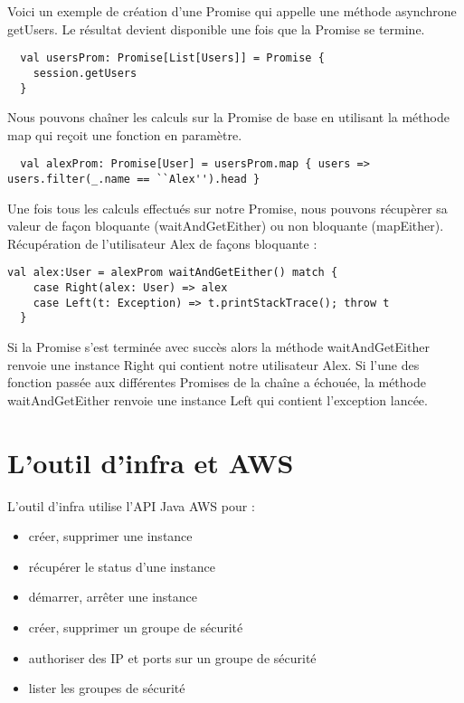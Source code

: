 Voici un exemple de création d'une Promise qui appelle une méthode asynchrone
getUsers. Le résultat devient disponible une fois que la Promise se termine.
\lstset{language=scala,
  frame=single                   %
}
\begin{lstlisting}
  val usersProm: Promise[List[Users]] = Promise {
    session.getUsers
  }
\end{lstlisting}

Nous pouvons chaîner les calculs sur la Promise de base en utilisant la méthode
map qui reçoit une fonction en paramètre. 
\begin{lstlisting}
  val alexProm: Promise[User] = usersProm.map { users => users.filter(_.name == ``Alex'').head }
\end{lstlisting}

Une fois tous les calculs effectués sur notre Promise, nous pouvons récupèrer sa
valeur de façon bloquante (waitAndGetEither) ou non bloquante (mapEither).
Récupération de l'utilisateur Alex de façons bloquante :
\begin{lstlisting}
val alex:User = alexProm waitAndGetEither() match {
    case Right(alex: User) => alex
    case Left(t: Exception) => t.printStackTrace(); throw t
  }
\end{lstlisting}
Si la Promise s'est terminée avec succès alors la méthode waitAndGetEither
renvoie une instance Right qui contient notre utilisateur Alex.
Si l'une des fonction passée aux différentes Promises de la chaîne a échouée, la
méthode waitAndGetEither renvoie une instance Left qui contient l'exception
lancée.

\section{L'outil d'infra et AWS}

L'outil d'infra utilise l'API Java AWS pour :
\begin{itemize}
\item créer, supprimer une instance
\item récupérer le status d'une instance
\item démarrer, arrêter une instance
\item créer, supprimer un groupe de sécurité
\item authoriser des IP et ports sur un groupe de sécurité
\item lister les groupes de sécurité
\end{itemize}


